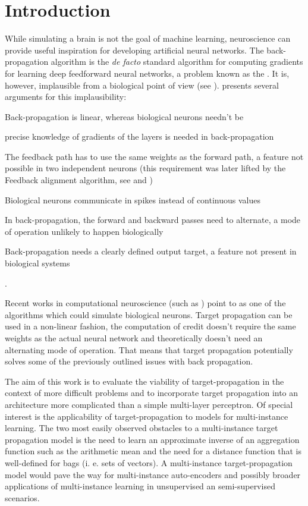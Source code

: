 \chapter*{Introduction}

While simulating a brain is not the goal of machine learning, neuroscience can provide useful inspiration for developing artificial neural networks. The back-propagation algorithm is the \textit{de facto} standard algorithm for computing gradients for learning deep feedforward neural networks, a problem known as the . It is, however, implausible from a biological point of view (see \cite{crick_recent_1989}). \cite{bengio_towards_2015} presents several arguments for this implausibility:
\begin{enumerate*}[label=(\arabic*)]
	\item Back-propagation is linear, whereas biological neurons needn't be
	\item precise knowledge of gradients of the layers is needed in back-propagation
	\item The feedback path has to use the same weights as the forward path, a feature not possible in two independent neurons (this requirement was later lifted by the Feedback alignment algorithm, see \cite{lillicrap_random_2016} and \cite{nokland_direct_2016})
	\item Biological neurons communicate in spikes instead of continuous values
	\item In back-propagation, the forward and backward passes need to alternate, a mode of operation unlikely to happen biologically
	\item Back-propagation needs a clearly defined output target, a feature not present in biological systems
\end{enumerate*}.

Recent works in computational neuroscience (such as \cite{guerguiev_towards_2017}) point to  as one of the algorithms which could simulate biological neurons. Target propagation can be used in a non-linear fashion, the computation of credit doesn't require the same weights as the actual neural network and theoretically doesn't need an alternating mode of operation. That means that target propagation potentially solves some of the previously outlined issues with back propagation.

The aim of this work is to evaluate the viability of target-propagation in the context of more difficult problems and to incorporate target propagation into an architecture more complicated than a simple multi-layer perceptron. Of special interest is the applicability of target-propagation to models for multi-instance learning. The two most easily observed obstacles to a multi-instance target propagation model is the need to learn an approximate inverse of an aggregation function such as the arithmetic mean and the need for a distance function that is well-defined for bags (i. e. sets of vectors). A multi-instance target-propagation model would pave the way for multi-instance auto-encoders and possibly broader applications of multi-instance learning in unsupervised an semi-supervised scenarios.

